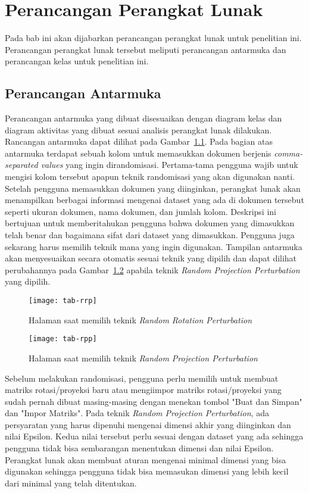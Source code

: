 \chapter{Perancangan Perangkat Lunak}
\label{chap:perancangan}

Pada bab ini akan dijabarkan perancangan perangkat lunak untuk penelitian ini. Perancangan perangkat lunak tersebut meliputi perancangan antarmuka dan perancangan kelas untuk penelitian ini.

\section{Perancangan Antarmuka}
\label{sec:antarmuka}

Perancangan antarmuka yang dibuat disesuaikan dengan diagram kelas dan diagram aktivitas yang dibuat sesuai analisis perangkat lunak dilakukan. Rancangan antarmuka dapat dilihat pada Gambar~\ref{fig:tab-rrp}. Pada bagian atas antarmuka terdapat sebuah kolom untuk memasukkan dokumen berjenis \textit{comma-separated values} yang ingin dirandomisasi. Pertama-tama pengguna wajib untuk mengisi kolom tersebut apapun teknik randomisasi yang akan digunakan nanti. Setelah pengguna memasukkan dokumen yang diinginkan, perangkat lunak akan menampilkan berbagai informasi mengenai dataset yang ada di dokumen tersebut seperti ukuran dokumen, nama dokumen, dan jumlah kolom. Deskripsi ini bertujuan untuk memberitahukan pengguna bahwa dokumen yang dimasukkan telah benar dan bagaimana sifat dari dataset yang dimasukkan. Pengguna juga sekarang harus memilih teknik mana yang ingin digunakan. Tampilan antarmuka akan menyesuaikan secara otomatis sesuai teknik yang dipilih dan dapat dilihat perubahannya pada Gambar~\ref{fig:tab-rpp} apabila teknik \textit{Random Projection Perturbation} yang dipilih.

\begin{figure}
	\centering
	\texttt{[image: tab-rrp]}
	\caption{Halaman saat memilih teknik \textit{Random Rotation Perturbation}}
	\label{fig:tab-rrp}
\end{figure}

\begin{figure}
	\centering
	\texttt{[image: tab-rpp]}
	\caption{Halaman saat memilih teknik \textit{Random Projection Perturbation}}
	\label{fig:tab-rpp}
\end{figure}

Sebelum melakukan randomisasi, pengguna perlu memilih untuk membuat matriks rotasi/proyeksi baru atau mengiimpor matriks rotasi/proyeksi yang sudah pernah dibuat masing-masing dengan menekan tombol "Buat dan Simpan" dan "Impor Matriks". Pada teknik \textit{Random Projection Perturbation}, ada persyaratan yang harus dipenuhi mengenai dimensi akhir yang diinginkan dan nilai Epsilon. Kedua nilai tersebut perlu sesuai dengan dataset yang ada sehingga pengguna tidak bisa sembarangan menentukan dimensi dan nilai Epsilon. Perangkat lunak akan membuat aturan mengenai minimal dimensi yang bisa digunakan sehingga pengguna tidak bisa memasukan dimensi yang lebih kecil dari minimal yang telah ditentukan.

